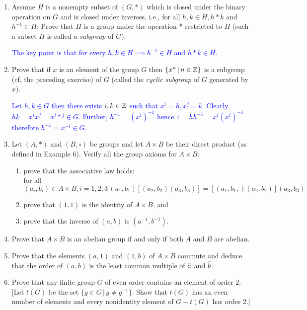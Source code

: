 \documentclass[10pt,a4paper]{report}
\newcommand{\BLUE}[1]{\textcolor{blue}{#1}}
\begin{document}
\begin{enumerate}
	\item Assume $H$ is a nonempty subset of $(G,*)$ which is closed under the binary operation on $G$ and is closed under inverses, i.e., for all $h,k\in H, h*k$ and $h^{-1}\in H$;  Prove that $H$ is a group under the operation * restricted to $H$ (such a subset $H$ is called a \textit{subgroup} of $G$).
	
	\BLUE{The key point is that for every $h,k\in H \implies h^{-1}\in H$ and $ h*k\in H$.
	}
	
	\item Prove that if $x$ is an element of the group $G$ then $\{x^n\,|\,n\in\mathbb{Z}\}$ is a subgroup (cf, the preceding exercise) of $G$ (called the \textit{cyclic subgroup} of $G$ generated by $x$).
	
	\BLUE{Let $h,k \in G$ then there exists $i,k \in\mathbb{Z}$ such that $x^i=h, x^j=k$.  Clearly $hk=x^ix^j=x^{i+j}\in G$.  Further, $h^{-1} = (x^i)^{-1}$ hence $1=hh^{-1}=x^i(x^i)^{-1}$ therefore $h^{-1} = x^{-i} \in G$.
	}
	
	\item Let $(A,*)$ and $(B,\circ)$ be groups and let $A \times B$ be their direct product (as defined in Example 6).  Verify all the group axioms for $A \times B$:
	\begin{enumerate}
		\item prove that the associative law holds:  \\for all $(a_i,b_i)\in A \times B, i=1,2,3\, (a_1,b_1)[(a_2,b_2)(a_3,b_3)]=[(a_1,b_1,)(a_2,b_2)](a_3,b_3)$
		\item prove that $(1,1)$ is the identity of $A\times B$, and
		\item prove that the inverse of $(a,b)$ is $(a^{-1},b^{-1})$.
	\end{enumerate}
	
	\item Prove that $A\times B$ is an abelian group if and only if both $A$ and $B$ are abelian.
	
	\item Prove that the elements $(a,1)$ and $(1,b)$ of $A\times B$ commute and deduce that the order of $(a,b)$ is the least common multiple of $\overline{a}$ and $\overline{b}$.
	
	\item Prove that any finite group $G$ of even order contains an element of order 2. [Let $t(G)$ be the set $\{g \in G\,|\, g \ne g^{-1}\}$.  Show that $t(G)$ has an even number of elements and every nonidentity element of $G-t(G)$ has order 2.]
	

\end{enumerate}
\end{document}
